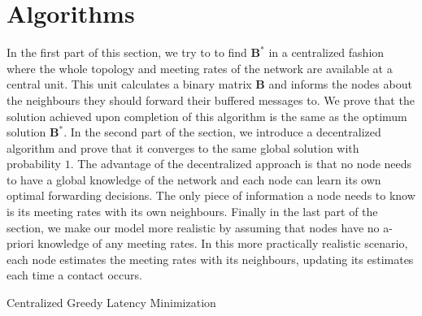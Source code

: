 \documentclass[journal,onecolumn,11pt]{IEEEtran}
\theoremstyle{plain}
\theoremstyle{definition}
\begin{document}
\section{Algorithms}\label{sec:algo}

In the first part of this section, we try to to find $\mathbf{B}^*$ in
a centralized fashion where the whole topology and meeting rates of
the network are available at a central unit. This unit calculates a
binary matrix $\mathbf{B}$ and informs the nodes about the neighbours
they should forward their buffered messages to. We prove that the
solution achieved upon completion of this algorithm is the same as the
optimum solution $\mathbf{B}^*$. In the second part of the section,
we introduce a decentralized algorithm and prove that it converges to
the same global solution with
probability $1$. The advantage of the decentralized approach is that
no node needs to have a global knowledge of the network and each node
can learn its own optimal forwarding decisions. The only piece of
information a node needs to know is its meeting rates with its own
neighbours. Finally in the last part of the section, we make our
model more realistic by assuming that nodes have no a-priori knowledge
of any meeting rates. In this more practically realistic scenario,
each node estimates the meeting rates with its neighbours, updating
its estimates each time a contact occurs.

\begin{algorithm}[!htb]
\caption{Centralized Greedy Latency Minimization} \label{algo:cen}
\begin{spacing}{1.0}
\begin{algorithmic}[1]
		\vspace{3mm}

				\vspace{0.15cm}
			\ENDFOR
		\ENDWHILE

\end{algorithmic}
\end{spacing}
\end{algorithm}
\end{document}
